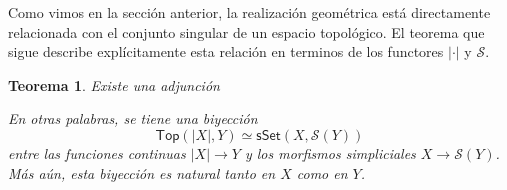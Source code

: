 \documentclass[11pt]{report}
\theoremstyle{colored}
\newtheorem{theorem}{Teorema}[section]
\newcommand{\cat}[1]{\mathsf{#1}}
\begin{document}
Como vimos en la sección anterior, la realización geométrica está directamente relacionada con el conjunto singular de un espacio topológico. El teorema que sigue describe explícitamente esta relación en terminos de los functores $| \cdot |$ y $\mathcal{S}$.

\begin{theorem} Existe una adjunción
\begin{center}
\end{center}
En otras palabras, se tiene una biyección
\[
\cat{Top}(|X|,Y) \simeq \cat{sSet}(X,\mathcal{S}(Y))
\]
entre las funciones continuas $|X| \to Y$ y los morfismos simpliciales $X \to \mathcal{S}(Y)$. Más aún, esta biyección es natural tanto en $X$ como en $Y$.
\end{theorem}
\end{document}
